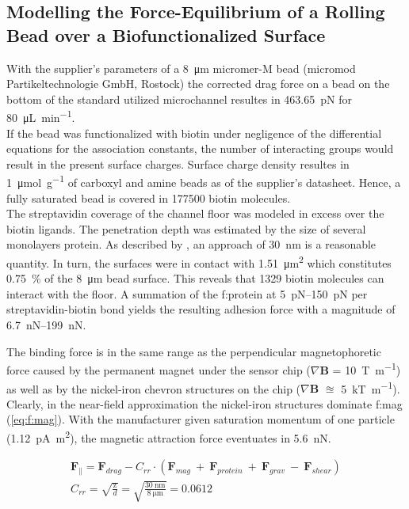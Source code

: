 \subsection{Modelling the Force-Equilibrium of a Rolling Bead over a Biofunctionalized Surface}
\label{sec:res:forcesim}
With the supplier's parameters of a \SI{8}{\micro\meter} micromer-M bead (micromod Partikeltechnologie GmbH, Rostock) the corrected drag force on a bead on the bottom of the standard utilized microchannel resultes in \SI{463.65}{\pico\newton} for \SI{80}{\micro\liter\per\minute}.\\
If the bead was functionalized with biotin under negligence of the differential equations for the association constants, the number of interacting groups would result in the present surface charges. Surface charge density resultes in \SI{1}{\micro\mole\per\gram} of \gls{carboxyl} and \gls{amine} beads as of the supplier's datasheet. Hence, a fully saturated bead is covered in \num{177500} biotin molecules.\\
The streptavidin coverage of the channel floor was modeled in excess over the biotin ligands. The penetration depth was estimated by the size of several monolayers protein. As described by \citet{lit:fluidic:ModelMIT}, an approach of \SI{30}{\nano\meter} is a reasonable quantity. In turn, the surfaces were in contact with \SI{1.51}{\micro\meter\squared} which constitutes \SI{0.75}{\percent} of the \SI{8}{\micro\meter} bead surface. This reveals that \num{1329} biotin molecules can interact with the floor. A summation of the \gls{f:protein} at \SIrange{5}{150}{\pico\newton} per streptavidin-biotin bond yields the resulting adhesion force with a magnitude of \SIrange{6.7}{199}{\nano\newton}.\cite{lit:bio:biotin:rupture} 

The binding force is in the same range as the perpendicular magnetophoretic force caused by the permanent magnet under the sensor chip ($\nabla \mathbf{B}$ = \SI{10}{\tesla\per\meter}) as well as by the nickel-iron chevron structures on the chip ($\nabla \mathbf{B}$ $\approxeq$ \SI{5}{\kilo\tesla\per\meter}). Clearly, in the near-field approximation the nickel-iron structures dominate \gls{f:mag} (\cref{eq:f:mag}). With the manufacturer given saturation momentum of one particle (\SI{1.12}{\pico\ampere\meter\squared}), the magnetic attraction force eventuates in \SI{5.6}{\nano\newton}.

\begin{align}
	\mathbf{F}_\parallel = \mathbf{F}_{drag} - C_{rr} \cdot (\mathbf{F}_{mag} \ +\ \mathbf{F}_{protein}  \ +\ \mathbf{F}_{grav}\ -\ \mathbf{F}_{shear} ) \label{eq:f:balance} \\
	C_{rr} = \sqrt{\frac{\text{z}}{d}} = \sqrt{\frac{\SI{30}{\nano\meter}}{\SI{8}{\micro\meter}}} = 0.0612 \label{eq:corr:roll}
\end{align}

